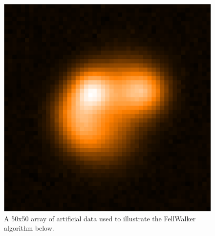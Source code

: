 \documentclass[final,authoryear,5p,times,twocolumn]{elsarticle}
\begin{document}
\begin{figure}
\includegraphics[width=\columnwidth]{sim}
\caption{A 50x50 array of artificial data used to illustrate the
FellWalker algorithm below.}
\label{fig:sim}
\end{figure}
\end{document}
